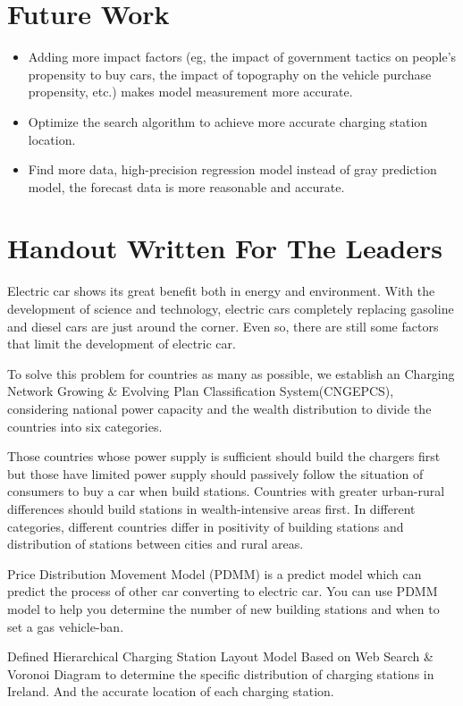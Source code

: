 \documentclass{mcmthesis}
\begin{document}
\section{Future Work}
\begin{itemize}
	\item Adding more impact factors (eg, the impact of government tactics on people's propensity to buy cars, the impact of topography on the vehicle purchase propensity, etc.) makes model measurement more accurate.
	\item Optimize the search algorithm to achieve more accurate charging station location.
	\item Find more data, high-precision regression model instead of gray prediction model, the forecast data is more reasonable and accurate.
\end{itemize}


\newpage
\section{Handout Written For The Leaders}


\par Electric car shows its great benefit both in energy and environment. With the development of science and technology, electric cars completely replacing gasoline and diesel cars are just around the corner. Even so, there are still some factors that limit the development of electric car.         
\par To solve this problem for countries as many as possible, we establish an Charging Network Growing \& Evolving Plan Classification System(CNGEPCS), considering national power capacity and the wealth distribution to divide the countries into six categories. 
\par Those countries whose power supply is sufficient should build the chargers first but those have limited power supply should passively follow the situation of consumers to buy a car when build stations. Countries with greater urban-rural differences should build stations in wealth-intensive areas first. In different categories, different countries differ in positivity of building stations and distribution of stations between cities and rural areas.
\par Price Distribution Movement Model (PDMM) is a predict model which can predict the process of other car converting to electric car. You can use PDMM model to help you determine the number of new building stations and when to set a gas vehicle-ban.
\par Defined Hierarchical Charging Station Layout Model Based on Web Search \& Voronoi Diagram to determine the specific distribution of charging stations in Ireland. And the accurate location of each charging station.
\end{document}
